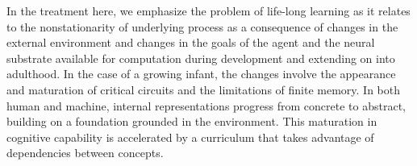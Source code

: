 \documentclass[letterpaper,11pt]{article}
\begin{document}
In the treatment here, we emphasize the problem of life-long learning as it relates to the nonstationarity of underlying process as a consequence of changes in the external environment and changes in the goals of the agent and the neural substrate available for computation during development and extending on into adulthood. In the case of a growing infant, the changes involve the appearance and maturation of critical circuits and the limitations of finite memory. In both human and machine, internal representations progress from concrete to abstract, building on a foundation grounded in the environment. This maturation in cognitive capability is accelerated by a curriculum that takes advantage of dependencies between concepts. 

\end{document}
